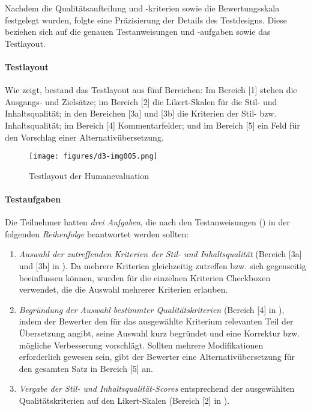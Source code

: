 Nachdem die Qualitätsaufteilung und -kriterien sowie die Bewertungsskala festgelegt wurden, folgte eine Präzisierung der Details des Testdesigns. Diese beziehen sich auf die genauen Testanweisungen und -aufgaben sowie das Testlayout.

\paragraph*{Testlayout}

Wie  zeigt, bestand das Testlayout aus fünf Bereichen: Im Bereich [1] stehen die Ausgangs- und Zielsätze; im Bereich [2] die Likert-Skalen für die Stil- und Inhaltsqualität; in den Bereichen [3a] und [3b] die Kriterien der Stil- bzw. Inhaltsqualität; im Bereich [4] Kommentarfelder; und im Bereich [5] ein Feld für den Vorschlag einer Alternativübersetzung.


\begin{figure}
\texttt{[image: figures/d3-img005.png]}
\caption{\label{fig:4:8}Testlayout der Humanevaluation}
\end{figure}

\paragraph*{Testaufgaben}

Die Teilnehmer hatten \textit{drei Aufgaben}, die nach den Testanweisungen () in der folgenden \textit{Reihenfolge} beantwortet werden sollten:

\begin{enumerate}[label = {(\arabic*)}, align = left]
\item \textit{Auswahl der zutreffenden Kriterien der Stil- und Inhaltsqualität} (Bereich [3a] und [3b] in ). Da mehrere Kriterien gleichzeitig zutreffen bzw. sich gegenseitig beeinflussen können, wurden für die einzelnen Kriterien Checkboxen verwendet, die die Auswahl mehrerer Kriterien erlauben.
\item \textit{Begründung der Auswahl bestimmter Qualitätskriterien} (Bereich [4] in ), indem der Bewerter den für das ausgewählte Kriterium relevanten Teil der Übersetzung angibt, seine Auswahl kurz begründet und eine Korrektur bzw. mögliche Verbesserung vorschlägt. Sollten mehrere Modifikationen erforderlich gewesen sein, gibt der Bewerter eine Alternativübersetzung für den gesamten Satz in Bereich [5] an.
\item \textit{Vergabe der Stil- und Inhaltsqualität-Scores} entsprechend der ausgewählten Qualitätskriterien auf den Likert-Skalen (Bereich [2] in ).
\end{enumerate}

